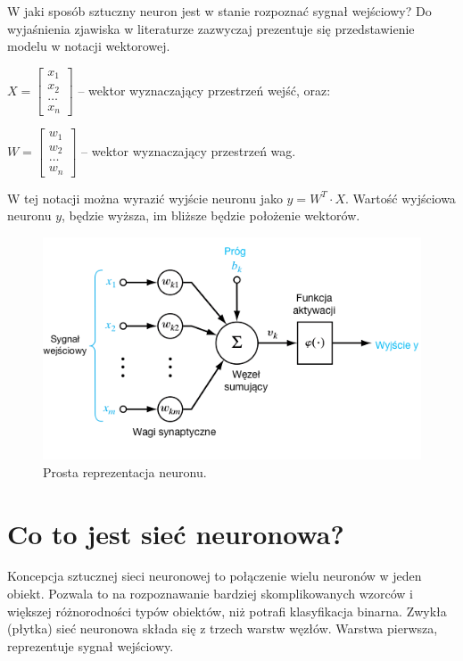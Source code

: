 \documentclass[12pt,a4paper,twoside,titlepage,openright]{book}
\begin{document}
W jaki sposób sztuczny neuron jest w stanie rozpoznać sygnał wejściowy? Do wyjaśnienia zjawiska w literaturze zazwyczaj prezentuje się przedstawienie modelu w notacji wektorowej.


\(X = \begin{bmatrix} x_{1} \\ x_{2} \\ \dots \\ x_{n} \end{bmatrix} \) -- wektor wyznaczający przestrzeń wejść, oraz:


\(W = \begin{bmatrix} w_{1} \\ w_{2} \\ \dots \\ w_{n} \end{bmatrix} \) -- wektor wyznaczający przestrzeń wag.

W tej notacji można wyrazić wyjście neuronu jako \(y= W^T \cdot X\). Wartość wyjściowa neuronu \(y\), będzie wyższa, im bliższe będzie położenie wektorów. \cite{sieciNeuronowe}

\begin{figure}[ht]
	\centering
			\includegraphics[resolution=100, scale=0.7]{Neuron.png}
		\caption{Prosta reprezentacja neuronu.}
\end{figure}

\section{Co to jest sieć neuronowa?}
Koncepcja sztucznej sieci neuronowej to połączenie wielu neuronów w jeden obiekt. Pozwala to na rozpoznawanie bardziej skomplikowanych wzorców i większej różnorodności typów obiektów, niż potrafi klasyfikacja binarna. Zwykła (płytka) sieć neuronowa składa się z trzech warstw węzłów. Warstwa pierwsza, reprezentuje sygnał wejściowy.
\end{document}
